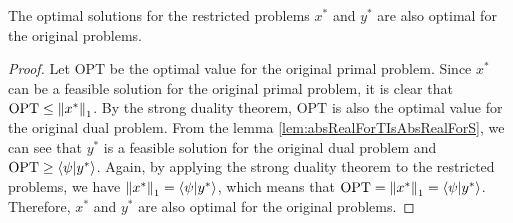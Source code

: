 \documentclass[\main/main]{subfiles}
\begin{document}
\begin{theorem}
    The optimal solutions for the restricted problems $x^*$ and $y^*$ are also optimal for the original problems.
\end{theorem}
\begin{proof}
    Let $\mathrm{OPT}$ be the optimal value for the original primal problem.
    Since $x^*$ can be a feasible solution for the original primal problem, it is clear that $\mathrm{OPT} \leq \norm{x^*}_1$.
    By the strong duality theorem, $\mathrm{OPT}$ is also the optimal value for the original dual problem.
    From the lemma \ref{lem:absRealForTIsAbsRealForS},
    we can see that $y^*$ is a feasible solution for the original dual problem and $\mathrm{OPT} \geq \braket{\psi}{y^*}$.
    Again, by applying the strong duality theorem to the restricted problems,
    we have $\norm{x^*}_1 = \braket{\psi}{y^*}$, which means that $\mathrm{OPT} = \norm{x^*}_1 = \braket{\psi}{y^*}$.
    Therefore, $x^*$ and $y^*$ are also optimal for the original problems.
\end{proof}
\end{document}
